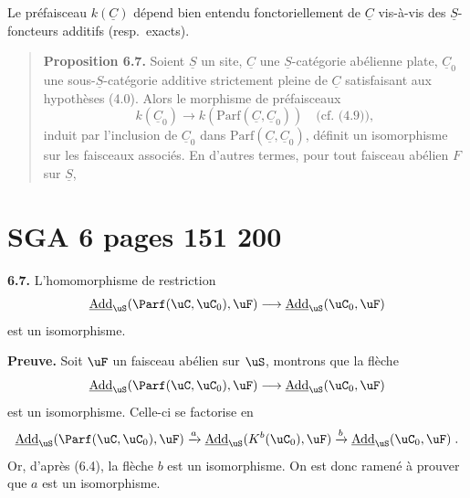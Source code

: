 Le préfaisceau $k(\underline{C})$ dépend bien entendu fonctoriellement de $\underline{C}$ vis-à-vis des $\underline{S}$-foncteurs additifs (resp.\ exacts).

\begin{quote}
\textbf{Proposition 6.7.} Soient $\underline{S}$ un site, $\underline{C}$ une $\underline{S}$-catégorie abélienne plate, $\underline{C}_0$ une sous-$\underline{S}$-catégorie additive strictement pleine de $\underline{C}$ satisfaisant aux hypothèses (4.0). Alors le morphisme de préfaisceaux
\[
k(\underline{C}_0) \longrightarrow k(\mathrm{Parf}(\underline{C}, \underline{C}_0)) \quad \text{(cf.\ (4.9))},
\]
induit par l'inclusion de $\underline{C}_0$ dans $\mathrm{Parf}(\underline{C}, \underline{C}_0)$, définit un isomorphisme sur les faisceaux associés. En d'autres termes, pour tout faisceau abélien $F$ sur $\underline{S}$,
\end{quote}


\clearpage
{}
\section*{SGA 6 pages 151 200}
\setcounter{page}{151}




\noindent\textbf{6.7.} L'homomorphisme de restriction
\[
\underline{\operatorname{Add}}_{\uS}(\Parf(\uC,\uC_0), \uF) \longrightarrow \underline{\operatorname{Add}}_{\uS}(\uC_0, \uF)
\]
est un isomorphisme.

\smallskip
\noindent\textbf{Preuve.} Soit $\uF$ un faisceau ab\'{e}lien sur $\uS$, montrons que la fl\`{e}che
\[
\underline{\operatorname{Add}}_{\uS}(\Parf(\uC,\uC_0), \uF) \longrightarrow \underline{\operatorname{Add}}_{\uS}(\uC_0, \uF)
\]
est un isomorphisme. Celle-ci se factorise en
\[
\underline{\operatorname{Add}}_{\uS}(\Parf(\uC,\uC_0), \uF) \xrightarrow{a} \underline{\operatorname{Add}}_{\uS}(K^b(\uC_0), \uF) \xrightarrow{b} \underline{\operatorname{Add}}_{\uS}(\uC_0, \uF) \; .
\]
Or, d'apr\`{e}s (6.4), la fl\`{e}che $b$ est un isomorphisme. On est donc ramen\'{e} \`{a} prouver que $a$ est un isomorphisme.

